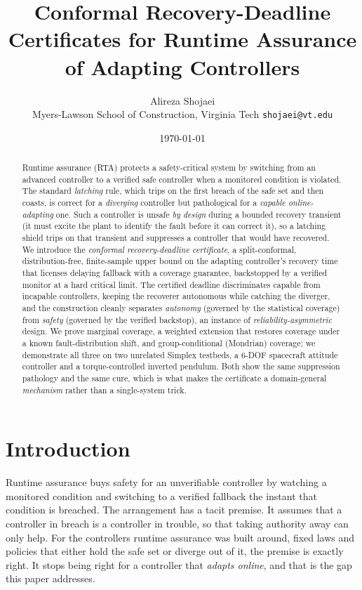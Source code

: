 \documentclass[11pt]{article}
\title{\textbf{Conformal Recovery-Deadline Certificates for Runtime Assurance of
Adapting Controllers}}
\author{Alireza Shojaei\\ \small Myers-Lawson School of Construction, Virginia Tech \quad \texttt{shojaei@vt.edu}}
\date{\today}
\theoremstyle{plain}
\theoremstyle{definition}
\begin{document}
\maketitle

\begin{abstract}
Runtime assurance (RTA) protects a safety-critical system by switching from an advanced
controller to a verified safe controller when a monitored condition is violated. The
standard \emph{latching} rule, which trips on the first breach of the safe set and then
coasts, is correct for a \emph{diverging} controller but pathological for a \emph{capable
online-adapting} one. Such a controller is unsafe \emph{by design} during a bounded
recovery transient (it must excite the plant to identify the fault before it can correct
it), so a latching shield trips on that transient and suppresses a controller that would
have recovered. We introduce the \emph{conformal recovery-deadline certificate}, a
split-conformal, distribution-free, finite-sample upper bound on the adapting controller's
recovery time that licenses delaying fallback with a coverage guarantee, backstopped by a
verified monitor at a hard critical limit. The certified deadline discriminates capable
from incapable controllers, keeping the recoverer autonomous while catching the diverger,
and the construction cleanly separates \emph{autonomy} (governed by the statistical
coverage) from \emph{safety} (governed by the verified backstop), an instance of
\emph{reliability-asymmetric} design. We prove marginal coverage, a weighted extension
that restores coverage under a known fault-distribution shift, and group-conditional
(Mondrian) coverage; we demonstrate all three on two unrelated Simplex testbeds, a 6-DOF
spacecraft attitude controller and a torque-controlled inverted pendulum. Both show the same
suppression pathology and the same cure, which is what makes the certificate a
domain-general \emph{mechanism} rather than a single-system trick.
\end{abstract}

\section{Introduction}
\label{sec:intro}
Runtime assurance buys safety for an unverifiable controller by watching a monitored
condition and switching to a verified fallback the instant that condition is breached. The
arrangement has a tacit premise. It assumes that a controller in breach is a controller in
trouble, so that taking authority away can only help. For the controllers runtime assurance
was built around, fixed laws and policies that either hold the safe set or diverge out of
it, the premise is exactly right. It stops being right for a controller that \emph{adapts
online}, and that is the gap this paper addresses.
\end{document}
